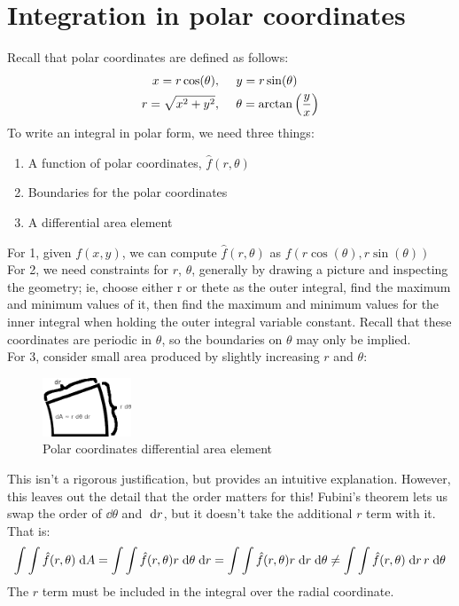 \documentclass[letterpaper,11pt]{article}
\begin{document}
\section*{Integration in polar coordinates}
Recall that polar coordinates are defined as follows:
\begin{align*}
  x = r \cos(\theta), & \hspace{5mm} y = r \sin(\theta)\\
  r = \sqrt{x^2 + y^2}, & \hspace{5mm} \theta = \arctan \left( \frac{y}{x} \right)
\end{align*}
To write an integral in polar form, we need three things:
\begin{enumerate}
  \item A function of polar coordinates, $\hat{f}(r, \theta)$
  \item Boundaries for the polar coordinates
  \item A differential area element
\end{enumerate}
For 1, given $f(x, y)$, we can compute $\hat{f}(r, \theta)$ as $f(r \cos(\theta), r \sin(\theta))$\\
For 2, we need constraints for $r$, $\theta$, generally by drawing a picture and inspecting the geometry; ie, choose either r or thete as the outer integral, find the maximum and minimum values of it, then find the maximum and minimum values for the inner integral when holding the outer integral variable constant.
Recall that these coordinates are periodic in $\theta$, so the boundaries on $\theta$ may only be implied.\\
For 3, consider small area produced by slightly increasing $r$ and $\theta$:
\begin{figure}[h]
  \centering \includegraphics[width=100px]{mech222/worksheet_1b_polar_diff_elem.png}
  \caption{Polar coordinates differential area element}
\end{figure}
This isn't a rigorous justification, but provides an intuitive explanation.
However, this leaves out the detail that the order matters for this!
Fubini's theorem lets us swap the order of $\dd{\theta}$ and $\;\mathrm{d}r$, but it doesn't take the additional $r$ term with it.
That is:
$$
\int \int \hat{f}(r, \theta) \;\mathrm{d}A = \int \int \hat{f}(r, \theta) r \;\mathrm{d}\theta \;\mathrm{d}r = \int \int \hat{f}(r, \theta) r \;\mathrm{d}r \;\mathrm{d}\theta \neq \int \int \hat{f}(r, \theta) \;\mathrm{d}r \, r \;\mathrm{d}\theta
$$
The $r$ term must be included in the integral over the radial coordinate.
\end{document}
